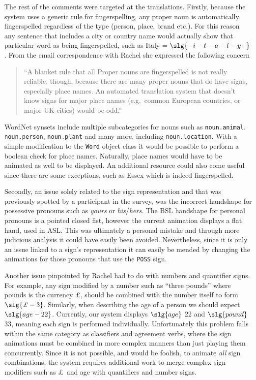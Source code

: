 \documentclass[12pt]{ociamthesis}  %
\begin{document}
The rest of the comments were targeted at the translations. Firstly, because the system uses a generic rule for fingerspelling, any proper noun is automatically fingerspelled regardless of the type (person, place, brand etc.). For this reason any sentence that includes a city or country name would actually show that particular word as being fingerspelled, such as Italy = $\slg{-i-t-a-l-y-}$. From the email correspondence with Rachel she expressed the following concern
\begin{quote}
``A blanket rule that all Proper nouns are fingerspelled is not really reliable, though, because there are many proper nouns that do have signs, especially place names. An automated translation system that doesn't know signs for major place names (e.g.\ common European countries, or major UK cities) would be odd.''
\end{quote}
WordNet synsets include multiple subcategories for nouns such as \texttt{noun.animal}. \texttt{noun.person}, \texttt{noun.plant} and many more, including \texttt{noun.location}. With a simple modification to the \texttt{Word} object class it would be possible to perform a boolean check for place names. Naturally, place names would have to be animated as well to be displayed. An additional resource could also come useful since there are some exceptions, such as Essex which is indeed fingerspelled.

Secondly, an issue solely related to the sign representation and that was previously spotted by a participant in the survey, was the incorrect handshape for possessive pronouns such as \textit{yours} or \textit{his}/\textit{hers}. The BSL handshape for personal pronouns is a pointed closed fist, however the current animation displays a flat hand, used in ASL. This was ultimately a personal mistake and through more judicious analysis it could have easily been avoided. Nevertheless, since it is only an issue linked to a sign's representation it can easily be mended by changing the animations for those pronouns that use the \texttt{POSS} sign.

Another issue pinpointed by Rachel had to do with numbers and quantifier signs. For example, any sign modified by a number such as ``three pounds'' where pounds is the currency \pounds, should be combined with the number itself to form $\slg{\pounds-3}$. Similarly, when describing the age of a person we should expect $\slg{age-22}$. Currently, our system displays $\slg{age}$ 22 and $\slg{pound}$ 33, meaning each sign is performed individually. Unfortunately this problem falls within the same category as classifiers and agreement verbs, where the sign animations must be combined in more complex manners than just playing them concurrently. Since it is not  possible, and would be foolish, to animate \textit{all} sign combinations, the system requires additional work to merge complex sign modifiers such as \pounds\ and age with quantifiers and number signs.
\end{document}
